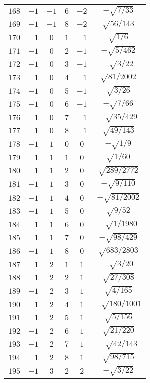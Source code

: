 \begin{table}
\begin{center}
\begin{tabular}{|c|c|c|c|c|c|}
$168$ & $-1$ & $-1$ & $6$ & $-2$ & $-\sqrt{7/33}$ \\ 
$169$ & $-1$ & $-1$ & $8$ & $-2$ & $\sqrt{56/143}$ \\ 
$170$ & $-1$ & $0$ & $1$ & $-1$ & $\sqrt{1/6}$ \\ 
$171$ & $-1$ & $0$ & $2$ & $-1$ & $-\sqrt{5/462}$ \\ 
$172$ & $-1$ & $0$ & $3$ & $-1$ & $-\sqrt{3/22}$ \\ 
$173$ & $-1$ & $0$ & $4$ & $-1$ & $\sqrt{81/2002}$ \\ 
$174$ & $-1$ & $0$ & $5$ & $-1$ & $\sqrt{3/26}$ \\ 
$175$ & $-1$ & $0$ & $6$ & $-1$ & $-\sqrt{7/66}$ \\ 
$176$ & $-1$ & $0$ & $7$ & $-1$ & $-\sqrt{35/429}$ \\ 
$177$ & $-1$ & $0$ & $8$ & $-1$ & $\sqrt{49/143}$ \\ 
$178$ & $-1$ & $1$ & $0$ & $0$ & $-\sqrt{1/9}$ \\ 
$179$ & $-1$ & $1$ & $1$ & $0$ & $\sqrt{1/60}$ \\ 
$180$ & $-1$ & $1$ & $2$ & $0$ & $\sqrt{289/2772}$ \\ 
$181$ & $-1$ & $1$ & $3$ & $0$ & $-\sqrt{9/110}$ \\ 
$182$ & $-1$ & $1$ & $4$ & $0$ & $-\sqrt{81/2002}$ \\ 
$183$ & $-1$ & $1$ & $5$ & $0$ & $\sqrt{9/52}$ \\ 
$184$ & $-1$ & $1$ & $6$ & $0$ & $-\sqrt{1/1980}$ \\ 
$185$ & $-1$ & $1$ & $7$ & $0$ & $-\sqrt{98/429}$ \\ 
$186$ & $-1$ & $1$ & $8$ & $0$ & $\sqrt{683/2803}$ \\ 
$187$ & $-1$ & $2$ & $1$ & $1$ & $-\sqrt{3/20}$ \\ 
$188$ & $-1$ & $2$ & $2$ & $1$ & $\sqrt{27/308}$ \\ 
$189$ & $-1$ & $2$ & $3$ & $1$ & $\sqrt{4/165}$ \\ 
$190$ & $-1$ & $2$ & $4$ & $1$ & $-\sqrt{180/1001}$ \\ 
$191$ & $-1$ & $2$ & $5$ & $1$ & $\sqrt{5/156}$ \\ 
$192$ & $-1$ & $2$ & $6$ & $1$ & $\sqrt{21/220}$ \\ 
$193$ & $-1$ & $2$ & $7$ & $1$ & $-\sqrt{42/143}$ \\ 
$194$ & $-1$ & $2$ & $8$ & $1$ & $\sqrt{98/715}$ \\ 
$195$ & $-1$ & $3$ & $2$ & $2$ & $-\sqrt{3/22}$ \\ 

\end{tabular}
\end{center}
\end{table}
